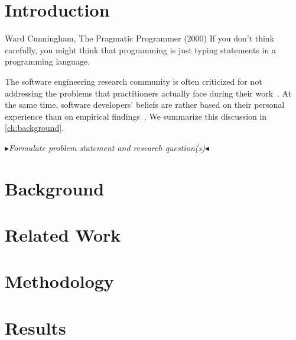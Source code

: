 \documentclass[
	pdftex,
	final,
	12pt,
	a4paper,
	parskip=false, %
	twoside, %
	footheight=0mm, %
  	foot include=false,
	toc=bibliography, %
	toc=listof, %
]{scrbook} %
\theoremstyle{definitiontight}
\newcommand{\quotemarks}[1]{{\bfseries{#1}}}
\newenvironment{chapter-quotation}[1]
{\begin{quotation}\pushQED{#1}\noindent\slshape\quotemarks{``}\hspace{-2pt}}
{\hspace{-2pt}\quotemarks{''}\fontsize{10}{10}\normalfont\\{ }\\\hspace*{\fill}---\popQED\end{quotation}}
\newcommand{\boxedtext}[1]{\fbox{\scriptsize\bfseries\textsf{#1}}}
\newcommand{\nota}[2]{
	\boxedtext{#1}
		{\small$\blacktriangleright$\emph{\textsl{#2}}$\blacktriangleleft$}
}
\newcommand{\todo}[1]{{\color{red}\nota{TODO}{#1}}} %
\begin{document}
{\lipsum[1-4]

\tableofcontents

\clearpage

\mainmatter %

\chapter{Introduction}
\label{ch:introduction}

\begin{chapter-quotation}{Ward Cunningham, The Pragmatic Programmer (2000)}
If you don't think carefully, you might think that programming is just typing statements in a programming language.
\end{chapter-quotation} 

The software engineering research community is often criticized for not addressing the problems that practitioners actually face during their work~\cite{Briand2012}.
At the same time, software developers' beliefs are rather based on their personal experience than on empirical findings~\cite{DevanbuZimmermannOthers2016}.
We summarize this discussion in \autoref{ch:background}.

\todo{Formulate problem statement and research question(s)}

\chapter{Background}
\label{ch:background}

\lipsum[1-12]

\chapter{Related Work}
\label{ch:related-work}

\lipsum[1-4]

\chapter{Methodology}
\label{ch:methodology}

\lipsum[1-4]

\chapter{Results}
\label{ch:results}

}
\end{document}
